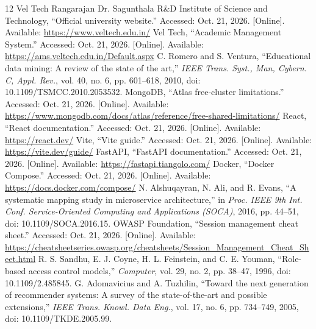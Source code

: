 \documentclass[10pt]{report}
\begin{document}
\clearpage{}
{}
\renewcommand{\bibname}{References}
\begingroup\normalsize\linespread{1.1}\selectfont
\begin{thebibliography}{12}
Vel Tech Rangarajan Dr. Sagunthala R\&D Institute of Science and Technology,
``Official university website.'' Accessed: Oct. 21, 2026. [Online]. Available:
\url{https://www.veltech.edu.in/}
Vel Tech, ``Academic Management System.'' Accessed: Oct. 21, 2026.
[Online]. Available: \url{https://ams.veltech.edu.in/Default.aspx}
C. Romero and S. Ventura,
``Educational data mining: A review of the state of the art,''
\textit{IEEE Trans. Syst., Man, Cybern. C, Appl. Rev.},
vol. 40, no. 6, pp. 601--618, 2010, doi: 10.1109/TSMCC.2010.2053532.
MongoDB, ``Atlas free-cluster limitations.'' Accessed: Oct. 21, 2026.
[Online]. Available: \url{https://www.mongodb.com/docs/atlas/reference/free-shared-limitations/}
React, ``React documentation.'' Accessed: Oct. 21, 2026.
[Online]. Available: \url{https://react.dev/}
Vite, ``Vite guide.'' Accessed: Oct. 21, 2026.
[Online]. Available: \url{https://vite.dev/guide/}
FastAPI, ``FastAPI documentation.'' Accessed: Oct. 21, 2026.
[Online]. Available: \url{https://fastapi.tiangolo.com/}
Docker, ``Docker Compose.'' Accessed: Oct. 21, 2026.
[Online]. Available: \url{https://docs.docker.com/compose/}
N. Alshuqayran, N. Ali, and R. Evans,
``A systematic mapping study in microservice architecture,''
in \textit{Proc. IEEE 9th Int. Conf. Service-Oriented Computing and Applications (SOCA)},
2016, pp. 44--51, doi: 10.1109/SOCA.2016.15.
OWASP Foundation, ``Session management cheat sheet.'' Accessed: Oct. 21, 2026.
[Online]. Available:
\url{https://cheatsheetseries.owasp.org/cheatsheets/Session_Management_Cheat_Sheet.html}
R. S. Sandhu, E. J. Coyne, H. L. Feinstein, and C. E. Youman,
``Role-based access control models,'' \textit{Computer},
vol. 29, no. 2, pp. 38--47, 1996, doi: 10.1109/2.485845.
G. Adomavicius and A. Tuzhilin,
``Toward the next generation of recommender systems: A survey of the state-of-the-art and possible extensions,''
\textit{IEEE Trans. Knowl. Data Eng.}, vol. 17, no. 6, pp. 734--749, 2005,
doi: 10.1109/TKDE.2005.99.
\end{thebibliography}
\endgroup
\end{document}
